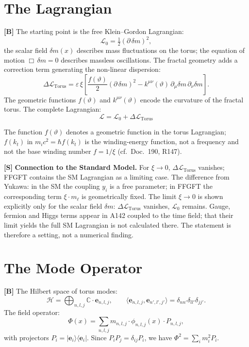 \section{The Lagrangian}

\textbf{[B]} The starting point is the free Klein--Gordon Lagrangian:
\[
  \mathcal L_0 = \tfrac12(\partial\,\delta m)^2,
\]
the scalar field $\delta m(x)$ describes mass fluctuations on the torus; the
equation of motion $\Box\,\delta m=0$ describes massless oscillations. The
fractal geometry adds a correction term generating the non-linear dispersion:
\[
  \Delta\mathcal L_{\text{Torus}}
  = \varepsilon\,\xi\!\left[
    \frac{f(\vartheta)}{2}(\partial\,\delta m)^2
    -k^{\mu\nu}(\vartheta)\,\partial_\mu\delta m\,\partial_\nu\delta m
  \right].
\]
The geometric functions $f(\vartheta)$ and $k^{\mu\nu}(\vartheta)$ encode the
curvature of the fractal torus. The complete Lagrangian:
\[
  \boxed{\;\mathcal L = \mathcal L_0 + \Delta\mathcal L_{\text{Torus}}\;}
\]

The function $f(\vartheta)$ denotes a geometric function in the torus Lagrangian; $f(k_t)$ in $m_ic^2 = \hbar f(k_t)$ is the winding-energy function, not a frequency and not the base winding number $f = 1/\xi$ (cf.\ Doc.~190, R147).

\textbf{[S]} \textbf{Connection to the Standard Model.} For $\xi\to0$,
$\Delta\mathcal L_{\text{Torus}}$ vanishes; FFGFT contains the SM Lagrangian as
a limiting case. The difference from Yukawa: in the SM the coupling $y_i$ is a
free parameter; in FFGFT the corresponding term $\xi\cdot m_\ell$ is
geometrically fixed.
The limit $\xi\to0$ is shown explicitly only for the scalar field $\delta m$: $\Delta\mathcal L_{\text{Torus}}$ vanishes, $\mathcal L_0$ remains. Gauge, fermion and Higgs terms appear in A142 coupled to the time field; that their limit yields the full SM Lagrangian is not calculated there. The statement is therefore a setting, not a numerical finding.

\section{The Mode Operator}

\textbf{[B]} The Hilbert space of torus modes:
\[
  \mathcal H = \bigoplus_{n,l,j}\mathbb C\cdot\mathbf e_{n,l,j},
  \qquad
  \langle\mathbf e_{n,l,j},\mathbf e_{n',l',j'}\rangle = \delta_{nn'}\delta_{ll'}\delta_{jj'}.
\]
The field operator:
\[
  \Phi(x) = \sum_{n,l,j} m_{n,l,j}\cdot\phi_{n,l,j}(x)\cdot P_{n,l,j},
\]
with projectors $P_i=|\mathbf e_i\rangle\langle\mathbf e_i|$. Since
$P_iP_j=\delta_{ij}P_i$, we have $\Phi^2=\sum_i m_i^2 P_i$.

